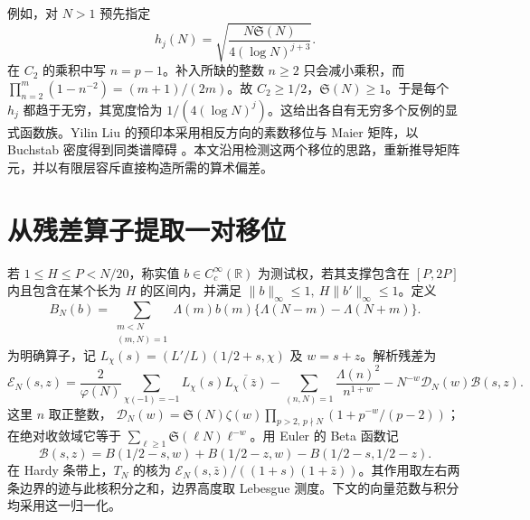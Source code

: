 \documentclass[UTF8,a4paper,11pt,fontset=fandol]{ctexart}
\newcommand{\Sg}{\mathfrak S}
\newcommand{\RR}{\mathbb R}
\newcommand{\Lam}{\Lambda}
\begin{document}
例如，对 \(N>1\) 预先指定
\[
              h_j(N)=\sqrt{\frac{N\Sg(N)}{4(\log N)^{j+3}}}.
                                                               \tag{2}
\]
在 \(C_2\) 的乘积中写 \(n=p-1\)。补入所缺的整数 \(n\ge2\) 只会减小乘积，而
\(\prod_{n=2}^{m}(1-n^{-2})=(m+1)/(2m)\)。故 \(C_2\ge1/2\)，\(\Sg(N)\ge1\)。于是每个 \(h_j\) 都趋于无穷，其宽度恰为 \(1/(4(\log N)^j)\)。这给出各自有无穷多个反例的显式函数族。Yilin Liu 的预印本采用相反方向的素数移位与 Maier 矩阵，以 Buchstab 密度得到同类谱障碍 \cite{YL}。本文沿用检测这两个移位的思路，重新推导矩阵元，并以有限层容斥直接构造所需的算术偏差。

\section{从残差算子提取一对移位}
若 \(1\le H\le P<N/20\)，称实值 \(b\in C^\infty_c(\RR)\) 为测试权，若其支撑包含在 \([P,2P]\) 内且包含在某个长为 \(H\) 的区间内，并满足
\(\|b\|_\infty\le1,\ H\|b'\|_\infty\le1\)。定义
\[
 B_N(b)=\sum_{\substack{m<N\\(m,N)=1}}\Lam(m)b(m)
                      \{\Lam(N-m)-\Lam(N+m)\}.
\]
为明确算子，记 \(L_\chi(s)= (L'/L)(1/2+s,\chi)\) 及 \(w=s+z\)。解析残差为
\[
 \mathcal E_N(s,z)=\frac{2}{\varphi(N)}
 \sum_{\chi(-1)=-1} L_\chi(s)\overline{L_\chi(\bar z)}
 -\sum_{(n,N)=1}\frac{\Lam(n)^2}{n^{1+w}}
 -N^{-w}\mathcal D_N(w)\mathcal B(s,z).
\]
这里 \(n\) 取正整数，
\(\mathcal D_N(w)=\Sg(N)\zeta(w)\prod_{p>2,\,p\nmid N}(1+p^{-w}/(p-2))\)；
在绝对收敛域它等于 \(\sum_{\ell\ge1}\Sg(\ell N)\ell^{-w}\)。用 Euler 的 Beta 函数记
\[
 \mathcal B(s,z)=B(1/2-s,w)+B(1/2-z,w)-B(1/2-s,1/2-z).
\]
在 Hardy 条带上，\(T_N\) 的核为 \(\mathcal E_N(s,\bar z)/((1+s)(1+\bar z))\)。其作用取左右两条边界的迹与此核积分之和，边界高度取 Lebesgue 测度。下文的向量范数与积分均采用这一归一化。
\end{document}
